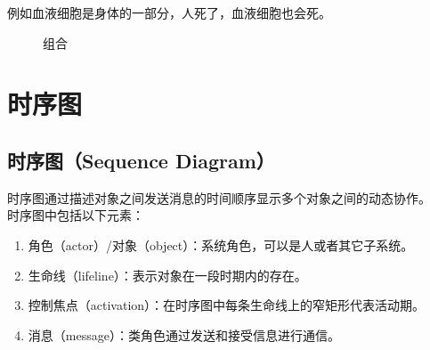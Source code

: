 例如血液细胞是身体的一部分，人死了，血液细胞也会死。\\

\begin{figure}[H]
    \centering
    \caption{组合}
\end{figure}

\newpage

\section{时序图}

\subsection{时序图（Sequence Diagram）}

时序图通过描述对象之间发送消息的时间顺序显示多个对象之间的动态协作。\\

时序图中包括以下元素：

\begin{enumerate}
    \item 角色（actor）/对象（object）：系统角色，可以是人或者其它子系统。

    \item 生命线（lifeline）：表示对象在一段时期内的存在。

    \item 控制焦点（activation）：在时序图中每条生命线上的窄矩形代表活动期。

    \item 消息（message）：类角色通过发送和接受信息进行通信。
\end{enumerate}


